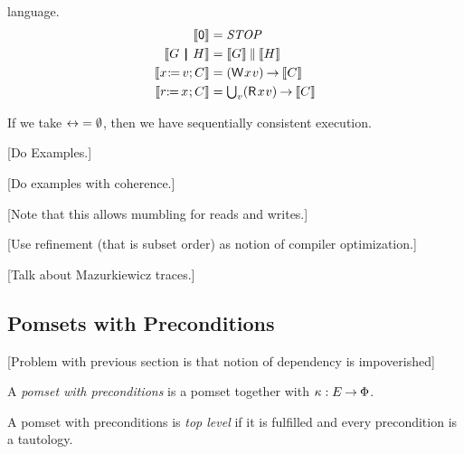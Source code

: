 language.
\begin{align*}
  \sem{\NIL} &= \sSTOP
  \\
  \sem{\aGrp \PAR \bGrp} &= \sem{\aGrp}\sPAR\sem{\bGrp}
  \\
  \sem{\PW{\aLoc}{\aVal}\SEMI \aCmd} &= \textstyle\DWP{\aLoc}{\aVal}\sPREFIX\sem{\aCmd}
  \\
  \sem{\PR{\aLoc}{\aReg}\SEMI \aCmd} &= \textstyle\bigcup_{\aVal}\DRP{\aLoc}{\aVal}\sPREFIX\sem{\aCmd}
\end{align*}

If we take ${\mathrel\leftrightarrow} = \emptyset$, then we have sequentially consistent
execution.

[Do Examples.]

[Do examples with coherence.]

[Note that this allows mumbling for reads and writes.]

[Use refinement (that is subset order) as notion of compiler optimization.]

[Talk about Mazurkiewicz traces.]

\subsection{Pomsets with Preconditions}

[Problem with previous section is that  notion of dependency is impoverished]

\begin{definition}
  A \emph{pomset with preconditions} is
  a pomset together with $\kappa:E\mathbin\rightarrow\Phi$.
\end{definition}

\begin{definition}
  A pomset with preconditions is \emph{top level} if it is fulfilled and
  every precondition is a tautology.
\end{definition}

